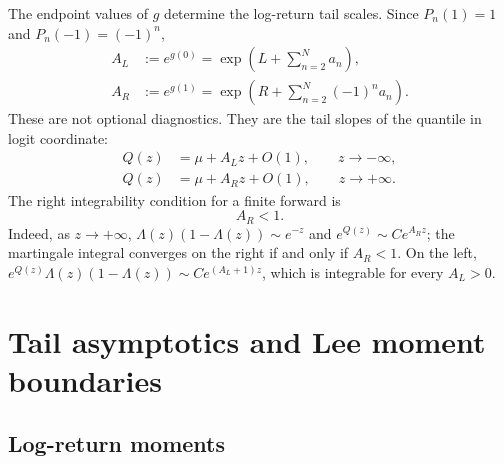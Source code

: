 \documentclass[11pt]{article}
\newcommand{\1}{\mathbf{1}}
\begin{document}
The endpoint values of $g$ determine the log-return tail scales.  Since $P_n(1)=1$ and $P_n(-1)=(-1)^n$,
\begin{align}
    A_L&:=e^{g(0)}=\exp\left(L+\sum_{n=2}^{N}a_n\right), \label{eq:AL}\\
    A_R&:=e^{g(1)}=\exp\left(R+\sum_{n=2}^{N}(-1)^n a_n\right). \label{eq:AR}
\end{align}
These are not optional diagnostics.  They are the tail slopes of the quantile in logit coordinate:
\begin{align}
    Q(z)&=\mu+A_L z+O(1),\qquad z\to-\infty,\label{eq:left_quant_tail}\\
    Q(z)&=\mu+A_R z+O(1),\qquad z\to+\infty.\label{eq:right_quant_tail}
\end{align}
The right integrability condition for a finite forward is
\begin{equation}
    \boxed{A_R<1.} \label{eq:AR_condition}
\end{equation}
Indeed, as $z\to+\infty$, $\Lambda(z)(1-\Lambda(z))\sim e^{-z}$ and $e^{Q(z)}\sim C e^{A_Rz}$; the martingale integral converges on the right if and only if $A_R<1$.  On the left, $e^{Q(z)}\Lambda(z)(1-\Lambda(z))\sim C e^{(A_L+1)z}$, which is integrable for every $A_L>0$.

\section{Tail asymptotics and Lee moment boundaries}

\subsection{Log-return moments}
\end{document}
